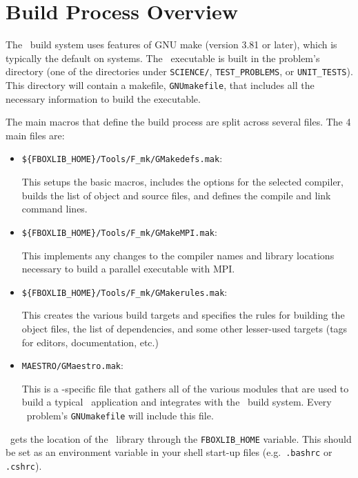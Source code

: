 \label{ch:make}

\section{Build Process Overview}

The \maestro\ build system uses features of GNU make (version 3.81 or
later), which is typically the default on systems.  The \maestro\
executable is built in the problem's directory (one of the directories
under {\tt SCIENCE/}, {\tt TEST\_PROBLEMS}, or {\tt UNIT\_TESTS}).  This
directory will contain a makefile, {\tt GNUmakefile}, that includes
all the necessary information to build the executable.

The main macros that define the build process are split across several
files.  The 4 main files are:
\begin{itemize}
\item {\tt \$\{FBOXLIB\_HOME\}/Tools/F\_mk/GMakedefs.mak}:

  This setups the basic macros, includes the options for the selected
  compiler, builds the list of object and source files, and defines
  the compile and link command lines.

\item {\tt \$\{FBOXLIB\_HOME\}/Tools/F\_mk/GMakeMPI.mak}:

  This implements any changes to the compiler names and library
  locations necessary to build a parallel executable with MPI.

\item {\tt \$\{FBOXLIB\_HOME\}/Tools/F\_mk/GMakerules.mak}:

  This creates the various build targets and specifies the rules for
  building the object files, the list of dependencies, and some other
  lesser-used targets (tags for editors, documentation, etc.)

\item {\tt MAESTRO/GMaestro.mak}:

  This is a \maestro-specific file that gathers all of the various
  modules that are used to build a typical \maestro\ application
  and integrates with the \fboxlib\ build system.  Every \maestro\
  problem's {\tt GNUmakefile} will include this file.

\end{itemize}

\maestro\ gets the location of the \fboxlib\ library through the 
{\tt FBOXLIB\_HOME} variable.  This should be set as an environment
variable in your shell start-up files (e.g.\ {\tt .bashrc} or {\tt
.cshrc}).

